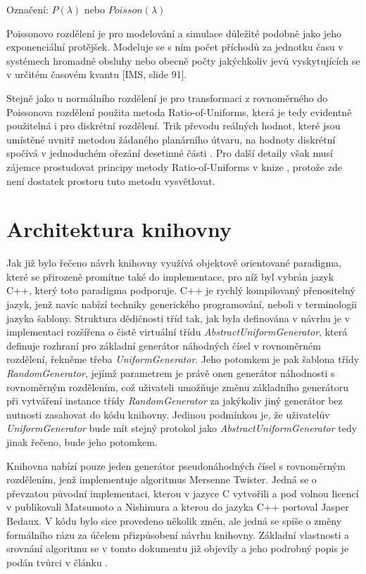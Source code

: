 \documentclass[a4paper,11pt]{article}
\begin{document}
Označení: $P(\lambda)$ nebo $Poisson(\lambda)$

Poissonovo rozdělení je pro modelování a simulace důležité podobně jako jeho exponenciální protějšek. Modeluje se s ním počet příchodů za jednotku času v systémech hromadné obsluhy nebo obecně počty jakýchkoliv jevů vyskytujících se v určitém časovém kvantu [IMS, slide 91]. 

Stejně jako u normálního rozdělení je pro transformaci z rovnoměrného do Poissonova rozdělení použita metoda Ratio-of-Uniforms, která je tedy evidentně použitelná i pro diskrétní rozdělení. Trik převodu reálných hodnot, které jsou umístěné uvnitř metodou žádaného planárního útvaru, na hodnoty diskrétní spočívá v jednoduchém ořezání desetinné části \cite{NR}. Pro další detaily však musí zájemce prostudovat principy metody Ratio-of-Uniforms v knize \cite{NR}, protože zde není dostatek prostoru tuto metodu vysvětlovat.

\section{Architektura knihovny}

Jak již bylo řečeno návrh knihovny využívá objektově orientované paradigma, které se přirozeně promítne také do implementace, pro níž byl vybrán jazyk C++, který toto paradigma podporuje. C++ je rychlý kompilovaný přenositelný jazyk, jenž navíc nabízí techniky generického programování, neboli v terminologii jazyka šablony. Struktura dědičnosti tříd tak, jak byla definována v návrhu je v implementaci rozšířena o čistě virtuální třídu \emph{AbstractUniformGenerator}, která definuje rozhraní pro základní generátor náhodných čísel v rovnoměrném rozdělení, řekněme třeba \emph{UniformGenerator}. Jeho potomkem je pak šablona třídy \emph{RandomGenerator}, jejímž parametrem je právě onen generátor náhodnosti s rovnoměrným rozdělením, což uživateli umožňuje změnu základního generátoru při vytváření instance třídy \emph{RandomGenerator} za jakýkoliv jiný generátor bez nutnosti zasahovat do kódu knihovny. Jedinou podmínkou je, že uživatelův \emph{UniformGenerator} bude mít stejný protokol jako \emph{AbstractUniformGenerator} tedy jinak řečeno, bude jeho potomkem.

Knihovna nabízí pouze jeden generátor pseudonáhodných čísel s rovnoměrným rozdělením, jenž implementuje algoritmus Mersenne Twister. Jedná se o převzatou původní implementaci, kterou v jazyce C vytvořili a pod volnou licencí v \cite{Matsumoto} publikovali Matsumoto a Nishimura a kterou do jazyka C++ portoval Jasper Bedaux. V kódu bylo sice provedeno několik změn, ale jedná se spíše o změny formálního rázu za účelem přizpůsobení návrhu knihovny. Základní vlastnosti a srovnání algoritmu se v tomto dokumentu již objevily a jeho podrobný popis je podán tvůrci v článku \cite{Matsumoto}.
\end{document}
